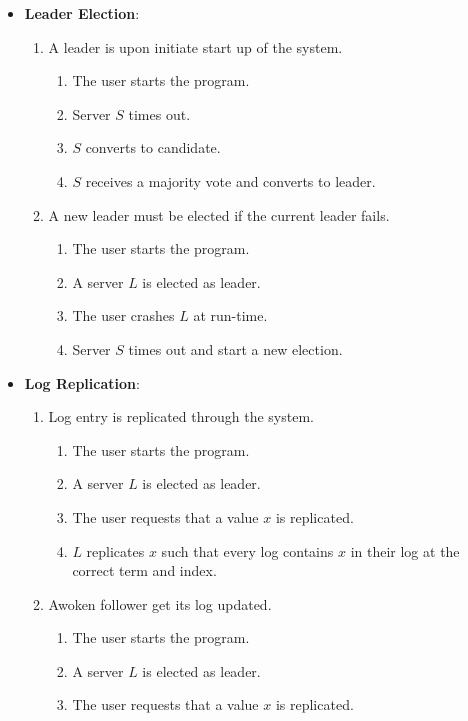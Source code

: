 \begin{itemize}
\item \textbf{Leader Election}:
    \begin{enumerate}
    \item A leader is upon initiate start up of the system.
        \begin{enumerate}
        \item The user starts the program.
        \item Server $S$ times out.
        \item $S$ converts to candidate.
        \item $S$ receives a majority vote and converts to leader.
        \end{enumerate}
    \item A new leader must be elected if the current leader fails.
        \begin{enumerate}
        \item The user starts the program.
        \item A server $L$ is elected as leader.
        \item The user crashes $L$ at run-time.
        \item Server $S$ times out and start a new election.
        \end{enumerate}
    \end{enumerate}
\item \textbf{Log Replication}:
    \begin{enumerate}
    \item Log entry is replicated through the system.
        \begin{enumerate}
        \item The user starts the program.
        \item A server $L$ is elected as leader.
        \item The user requests that a value $x$ is replicated.
        \item $L$ replicates $x$ such that every log contains $x$ in their log at the correct term and index.
        \end{enumerate}
    \item Awoken follower get its log updated.
        \begin{enumerate}
        \item The user starts the program.
        \item A server $L$ is elected as leader.
        \item The user requests that a value $x$ is replicated.

\end{enumerate}
\end{enumerate}
\end{itemize}
